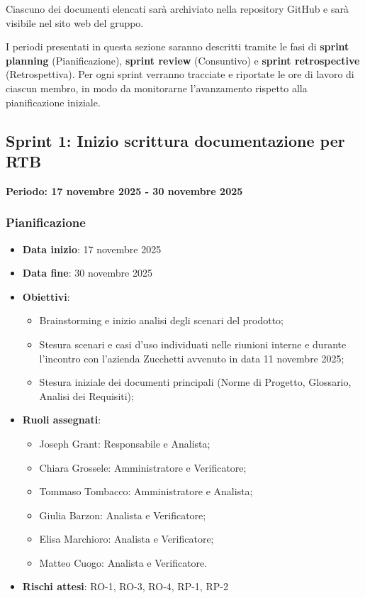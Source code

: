 \documentclass[11pt,a4paper]{article}
\begin{document}
\noindent Ciascuno dei documenti elencati sarà archiviato nella repository GitHub e sarà visibile nel sito web del gruppo.

I periodi presentati in questa sezione saranno descritti tramite le fasi di \textbf{sprint planning} (Pianificazione), \textbf{sprint review} (Consuntivo) e \textbf{sprint retrospective} (Retrospettiva). Per ogni sprint verranno tracciate e riportate le ore di lavoro di ciascun membro, in modo da monitorarne l'avanzamento rispetto alla pianificazione iniziale.

\newpage
\subsection{Sprint 1: Inizio scrittura documentazione per RTB}
{\textbf{Periodo: 17 novembre 2025 - 30 novembre 2025}\par}
\vspace{0.5em}

\subsubsection{Pianificazione}
\begin{itemize}
    \item \textbf{Data inizio}: 17 novembre 2025
    \item \textbf{Data fine}: 30 novembre 2025
    \item \textbf{Obiettivi}:
    \begin{itemize}
        \item Brainstorming e inizio analisi degli scenari del prodotto;
        \item Stesura scenari e casi d'uso individuati nelle riunioni interne e durante l'incontro con l'azienda Zucchetti avvenuto in data 11 novembre 2025;
        \item Stesura iniziale dei documenti principali (Norme di Progetto, Glossario, Analisi dei Requisiti);
    \end{itemize}
    \item \textbf{Ruoli assegnati}:
    \begin{itemize}
        \item Joseph Grant: Responsabile e Analista;
        \item Chiara Grossele: Amministratore e Verificatore;
        \item Tommaso Tombacco: Amministratore e Analista;
        \item Giulia Barzon: Analista e Verificatore;
        \item Elisa Marchioro: Analista e Verificatore;
        \item Matteo Cuogo: Analista e Verificatore.
    \end{itemize}
    \item \textbf{Rischi attesi}: RO-1, RO-3, RO-4, RP-1, RP-2
\end{itemize}
\end{document}

